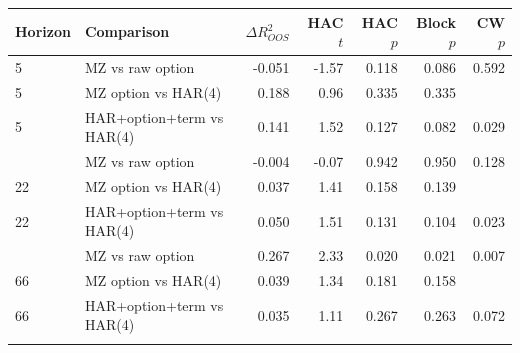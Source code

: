 \begin{tabular}{llrrrrr}
\toprule
Horizon & Comparison & $\Delta R^2_{OOS}$ & HAC $t$ & HAC $p$ & Block $p$ & CW $p$ \\
\midrule
5 & MZ vs raw option & -0.051 & -1.57 & 0.118 & 0.086 & 0.592 \\
5 & MZ option vs HAR(4) & 0.188 & 0.96 & 0.335 & 0.335 &  \\
5 & HAR+option+term vs HAR(4) & 0.141 & 1.52 & 0.127 & 0.082 & 0.029 \\
\addlinespace
22 & MZ vs raw option & -0.004 & -0.07 & 0.942 & 0.950 & 0.128 \\
22 & MZ option vs HAR(4) & 0.037 & 1.41 & 0.158 & 0.139 &  \\
22 & HAR+option+term vs HAR(4) & 0.050 & 1.51 & 0.131 & 0.104 & 0.023 \\
\addlinespace
66 & MZ vs raw option & 0.267 & 2.33 & 0.020 & 0.021 & 0.007 \\
66 & MZ option vs HAR(4) & 0.039 & 1.34 & 0.181 & 0.158 &  \\
66 & HAR+option+term vs HAR(4) & 0.035 & 1.11 & 0.267 & 0.263 & 0.072 \\
\addlinespace
\bottomrule
\end{tabular}
